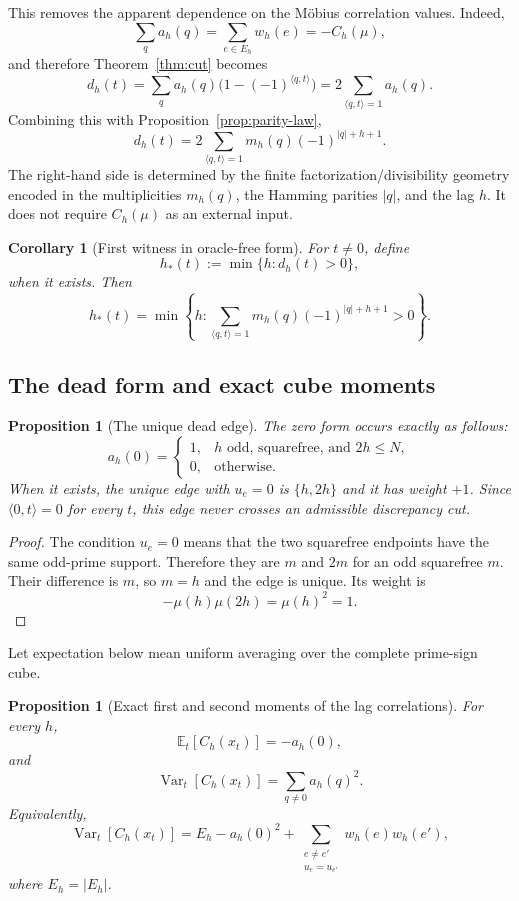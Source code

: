 \documentclass[11pt]{article}
\newtheorem{proposition}[theorem]{Proposition}
\newtheorem{corollary}[theorem]{Corollary}
\theoremstyle{definition}
\theoremstyle{remark}
\begin{document}
This removes the apparent dependence on the M\"obius correlation values.  Indeed,
\[
 \sum_q a_h(q)=\sum_{e\in E_h}w_h(e)=-C_h(\mu),
\]
and therefore Theorem~\ref{thm:cut} becomes
\[
 \boxed{
 d_h(t)=\sum_q a_h(q)\bigl(1-(-1)^{\langle q,t\rangle}\bigr)
 =2\sum_{\langle q,t\rangle=1}a_h(q).
 }
 \tag{3.1}
\]
Combining this with Proposition~\ref{prop:parity-law},
\[
 \boxed{
 d_h(t)=
 2\sum_{\langle q,t\rangle=1}
 m_h(q)(-1)^{|q|+h+1}.
 }
 \tag{3.2}
\]
The right-hand side is determined by the finite factorization/divisibility geometry encoded in the multiplicities $m_h(q)$, the Hamming parities $|q|$, and the lag $h$.  It does not require $C_h(\mu)$ as an external input.

\begin{corollary}[First witness in oracle-free form]
For $t\ne0$, define
\[
 h_*(t):=\min\{h:d_h(t)>0\},
\]
when it exists.  Then
\[
 \boxed{
 h_*(t)=
 \min\left\{h:
 \sum_{\langle q,t\rangle=1}
 m_h(q)(-1)^{|q|+h+1}>0
 \right\}.
 }
\]
\end{corollary}

\subsection{The dead form and exact cube moments}

\begin{proposition}[The unique dead edge]\label{prop:dead}
The zero form occurs exactly as follows:
\[
 a_h(0)=
 \begin{cases}
 1,&h\text{ odd, squarefree, and }2h\le N,\\
 0,&\text{otherwise}.
 \end{cases}
\]
When it exists, the unique edge with $u_e=0$ is $\{h,2h\}$ and it has weight $+1$.  Since $\langle0,t\rangle=0$ for every $t$, this edge never crosses an admissible discrepancy cut.
\end{proposition}

\begin{proof}
The condition $u_e=0$ means that the two squarefree endpoints have the same odd-prime support.  Therefore they are $m$ and $2m$ for an odd squarefree $m$.  Their difference is $m$, so $m=h$ and the edge is unique.  Its weight is
\[
 -\mu(h)\mu(2h)=\mu(h)^2=1.
\]
\end{proof}

Let expectation below mean uniform averaging over the complete prime-sign cube.

\begin{proposition}[Exact first and second moments of the lag correlations]\label{prop:moments-c}
For every $h$,
\[
 \boxed{\mathbb E_t[C_h(x_t)]=-a_h(0),}
\]
and
\[
 \boxed{
 \operatorname{Var}_t[C_h(x_t)]
 =\sum_{q\ne0}a_h(q)^2.
 }
\]
Equivalently,
\[
 \operatorname{Var}_t[C_h(x_t)]
 =E_h-a_h(0)^2
 +\sum_{\substack{e\ne e'\\u_e=u_{e'}}}w_h(e)w_h(e'),
\]
where $E_h=|E_h|$.
\end{proposition}
\end{document}
